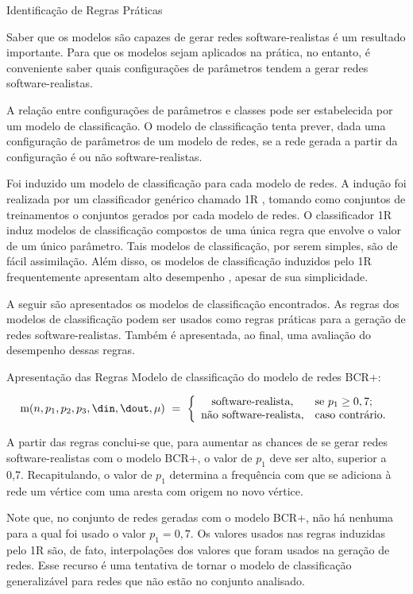 \begin{section}{Identificação de Regras Práticas}
	
	Saber que os modelos são capazes de gerar redes software-realistas é um resultado importante. Para que os modelos sejam aplicados na prática, no entanto, é conveniente saber quais configurações de parâmetros tendem a gerar redes software-realistas.
	
	A relação entre configurações de parâmetros e classes pode ser estabelecida por um modelo de classificação. O modelo de classificação tenta prever, dada uma configuração de parâmetros de um modelo de redes, se a rede gerada a partir da configuração é ou não software-realistas.
	
	Foi induzido um modelo de classificação para cada modelo de redes. A indução foi realizada por um classificador genérico chamado 1R \cite{OneR}, tomando como conjuntos de treinamentos o conjuntos gerados por cada modelo de redes. O classificador 1R induz modelos de classificação compostos de uma única regra que envolve o valor de um único parâmetro. Tais modelos de classificação, por serem simples, são de fácil assimilação. Além disso, os modelos de classificação induzidos pelo 1R frequentemente apresentam alto desempenho \cite{OneR}, apesar de sua simplicidade.
	
	A seguir são apresentados os modelos de classificação encontrados. As regras dos modelos de classificação podem ser usados como regras práticas para a geração de redes software-realistas. Também é apresentada, ao final, uma avaliação do desempenho dessas regras.
	
\begin{subsection}{Apresentação das Regras}
	Modelo de classificação do modelo de redes BCR+:
		
	$$
	\mathrm{m}(n, p_1, p_2, p_3, \din, \dout, \mu) ~=~
	\left\{
	\begin{array}{cl}
	\mbox{software-realista,} & \mbox{se } p_1 \ge 0,7; \\
	\mbox{não software-realista,} & \mbox{caso contrário.}
	\end{array}
	\right.
	$$
	
	A partir das regras conclui-se que, para aumentar as chances de se gerar redes software-realistas com o modelo BCR+, o valor de $p_1$ deve ser alto, superior a 0,7. Recapitulando, o valor de $p_1$ determina a frequência com que se adiciona à rede um vértice com uma aresta com origem no novo vértice.
	
	Note que, no conjunto de redes geradas com o modelo BCR+, não há nenhuma para a qual foi usado o valor $p_1 = 0,7$. Os valores usados nas regras induzidas pelo 1R são, de fato, interpolações dos valores que foram usados na geração de redes. Esse recurso é uma tentativa de tornar o modelo de classificação generalizável para redes que não estão no conjunto analisado.
	

\end{subsection}
\end{section}
